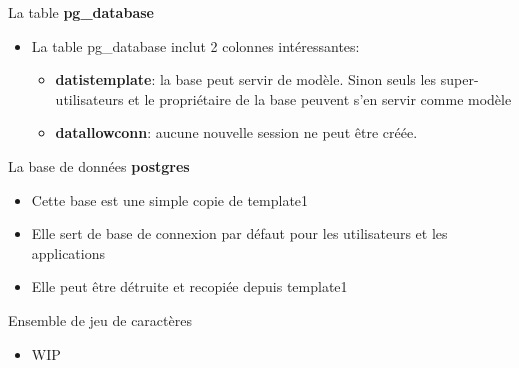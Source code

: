 
\begin{frame}{La table \textbf{pg\_database}}

\begin{itemize}
   \item La table pg\_database inclut 2 colonnes intéressantes:
   \begin{itemize}
      \item \textbf{datistemplate}: la base peut servir de modèle. Sinon seuls les super-utilisateurs et le propriétaire de la base peuvent s'en servir comme modèle
      \item \textbf{datallowconn}: aucune nouvelle session ne peut être créée.
   \end{itemize}
\end{itemize}

\end{frame}


\begin{frame}{La base de données \textbf{postgres}}

\begin{itemize}
   \item Cette base est une simple copie de template1
   \item Elle sert de base de connexion par défaut pour les utilisateurs et les applications
   \item Elle peut être détruite et recopiée depuis template1
\end{itemize}

\end{frame}


\begin{frame}[fragile]{Ensemble de jeu de caractères}

\begin{itemize}
   \item WIP
\end{itemize}

\begin{toile}
\end{toile}

\end{frame}


\newlength{\largeurtableau}
\setlength{\largeurtableau}{\textwidth}
\addtolength{\largeurtableau}{-2\leftmarginii}

